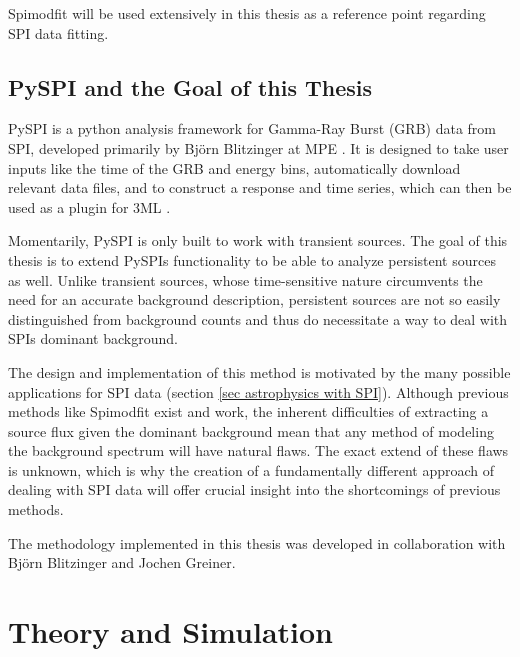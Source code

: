\documentclass{report}
\begin{document}
Spimodfit will be used extensively in this thesis as a reference point regarding SPI data fitting.



\section{PySPI and the Goal of this Thesis}
PySPI is a python analysis framework for Gamma-Ray Burst (GRB) data from SPI, developed primarily by Björn Blitzinger at MPE \cite{Biltzinger2022}. It is designed to take user inputs like the time of the GRB and energy bins, automatically download relevant data files, and to construct a response and time series, which can then be used as a plugin for 3ML \cite{3ml}.

Momentarily, PySPI is only built to work with transient sources. The goal of this thesis is to extend PySPIs functionality to be able to analyze persistent sources as well. Unlike transient sources, whose time-sensitive nature circumvents the need for an accurate background description, persistent sources are not so easily distinguished from background counts and thus do necessitate a way to deal with SPIs dominant background.

The design and implementation of this method is motivated by the many possible applications for SPI data (section \ref{sec astrophysics with SPI}). Although previous methods like Spimodfit exist and work, the inherent difficulties of extracting a source flux given the dominant background mean that any method of modeling the background spectrum will have natural flaws. The exact extend of these flaws is unknown, which is why the creation of a fundamentally different approach of dealing with SPI data will offer crucial insight into the shortcomings of previous methods.

The methodology implemented in this thesis was developed in collaboration with Björn Blitzinger and Jochen Greiner.

\chapter{Theory and Simulation}
\end{document}
